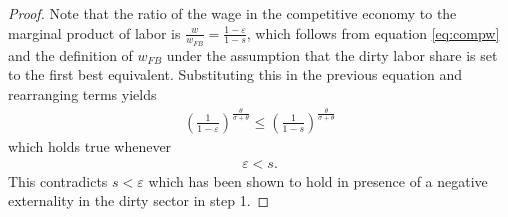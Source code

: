 \begin{proof}
Note that the ratio of the wage in the competitive economy to the marginal product of labor is $\frac{w}{w_{FB}}=\frac{1-\varepsilon}{1-s}$, which follows from equation \ref{eq:compw} and the definition of $w_{FB}$ under the assumption that the dirty labor share is set to the first best equivalent. Substituting this in the previous equation and rearranging terms yields
\begin{align}
\left(\frac{1}{1-\varepsilon}\right)^\frac{\theta}{\sigma+\theta}\leq \left(\frac{1}{1-s}\right)^\frac{\theta}{\sigma+\theta}
\end{align}
which holds true whenever
\begin{align}
\varepsilon<s.
\end{align}
This contradicts $s<\varepsilon$ which has been shown to hold in presence of a negative externality in the dirty sector in step 1. 
\end{proof}

